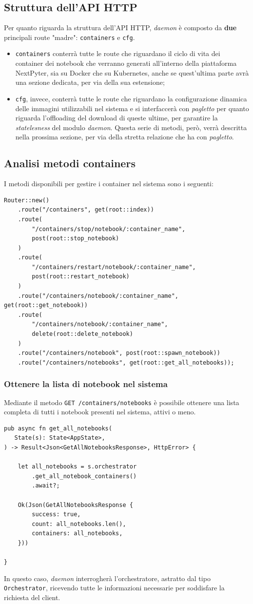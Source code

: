 \subsection{Struttura dell'API HTTP}
Per quanto riguarda la struttura dell'API HTTP, \textit{daemon} è composto da \textbf{due} principali route "madre": \verb|containers| e \verb|cfg|.
\begin{itemize}
    \item \verb|containers| conterrà tutte le route che riguardano il ciclo di vita dei container dei notebook che verranno generati all'interno della piattaforma NextPyter, sia su Docker che su Kubernetes, anche se quest'ultima parte avrà una sezione dedicata, per via della sua estensione;
    \item \verb|cfg|, invece, conterrà tutte le route che riguardano la configurazione dinamica delle immagini utilizzabili nel sistema e si interfaccerà con \textit{pagletto} per quanto riguarda l'offloading del download di queste ultime, per garantire la \textit{statelesness} del modulo \textit{daemon}. Questa serie di metodi, però, verrà descritta nella prossima sezione, per via della stretta relazione che ha con \textit{pagletto}.
\end{itemize}
\subsection{Analisi metodi containers}
I metodi disponibili per gestire i container nel sistema sono i seguenti:
\begin{verbatim}
Router::new()
    .route("/containers", get(root::index))
    .route(
        "/containers/stop/notebook/:container_name", 
        post(root::stop_notebook)
    )
    .route(
        "/containers/restart/notebook/:container_name", 
        post(root::restart_notebook)
    )
    .route("/containers/notebook/:container_name", get(root::get_notebook))
    .route(
        "/containers/notebook/:container_name", 
        delete(root::delete_notebook)
    )
    .route("/containers/notebook", post(root::spawn_notebook))
    .route("/containers/notebooks", get(root::get_all_notebooks));
\end{verbatim}
\subsubsection{Ottenere la lista di notebook nel sistema}
Mediante il metodo \verb|GET /containers/notebooks| è possibile ottenere una lista completa di tutti i notebook presenti nel sistema, attivi o meno.
\begin{verbatim}
pub async fn get_all_notebooks(
   State(s): State<AppState>,
) -> Result<Json<GetAllNotebooksResponse>, HttpError> {

    let all_notebooks = s.orchestrator
        .get_all_notebook_containers()
        .await?;

    Ok(Json(GetAllNotebooksResponse {
        success: true,
        count: all_notebooks.len(),
        containers: all_notebooks,
    }))

}
\end{verbatim}
In questo caso, \textit{daemon} interrogherà l'orchestratore, astratto dal tipo \verb|Orchestrator|, ricevendo tutte le informazioni necessarie per soddisfare la richiesta del client.
